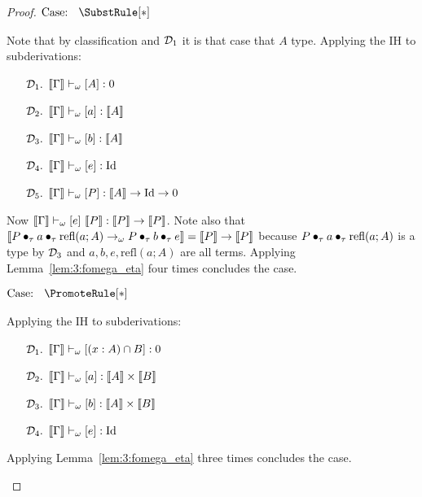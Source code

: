 \begin{proof}
    \begin{minipage}{.8\textwidth}$\text{Case: }\begin{array}{c} \SubstRule[*] \end{array}$\end{minipage}
    \begin{proofcase}
        Note that by classification and $\mathcal{D}_{1}$ it is that case that $A$ type.
        Applying the IH to subderivations:
        \begin{enumerate}
            \item[$\mathcal{D}_{1}.$] $\llbracket \Gamma \rrbracket \vdash_\omega [A] : 0$
            \item[$\mathcal{D}_{2}.$] $\llbracket \Gamma \rrbracket \vdash_\omega [a] : \llbracket A \rrbracket$
            \item[$\mathcal{D}_{3}.$] $\llbracket \Gamma \rrbracket \vdash_\omega [b] : \llbracket A \rrbracket$ 
            \item[$\mathcal{D}_{4}.$] $\llbracket \Gamma \rrbracket \vdash_\omega [e] : \textnormal{Id}$
            \item[$\mathcal{D}_{5}.$] $\llbracket \Gamma \rrbracket \vdash_\omega [P] : \llbracket A \rrbracket \to \textnormal{Id} \to 0$
        \end{enumerate}
        Now $\sema{\Gamma} \vdash_\omega [e]\ \sema{P} : \sema{P} \to \sema{P}$.
        Note also that $\llbracket P \bullet_{\tau} a \bullet_{\tau} \text{refl}(a;A) \to_\omega P \bullet_{\tau} b \bullet_{\tau} e \rrbracket = \llbracket P \rrbracket \to \llbracket P \rrbracket$ because $P \bullet_{\tau} a \bullet_{\tau} \text{refl}(a;A)$ is a type by $\mathcal{D}_{3}$ and $a, b, e, \text{refl}(a;A)$ are all terms.
        Applying Lemma~\ref{lem:3:fomega_eta} four times concludes the case.
    \end{proofcase}

    $\text{Case: }\begin{array}{c} \PromoteRule[*] \end{array}$
    \begin{proofcase}
        Applying the IH to subderivations:
        \begin{enumerate}
            \item[$\mathcal{D}_{1}.$] $\llbracket \Gamma \rrbracket \vdash_\omega [(x : A) \cap B] : 0$
            \item[$\mathcal{D}_{2}.$] $\llbracket \Gamma \rrbracket \vdash_\omega [a] : \llbracket A \rrbracket \times \llbracket B \rrbracket$
            \item[$\mathcal{D}_{3}.$] $\llbracket \Gamma \rrbracket \vdash_\omega [b] : \llbracket A \rrbracket \times \llbracket B \rrbracket$
            \item[$\mathcal{D}_{4}.$] $\llbracket \Gamma \rrbracket \vdash_\omega [e] : \textnormal{Id}$
        \end{enumerate}
        Applying Lemma~\ref{lem:3:fomega_eta} three times concludes the case.
    \end{proofcase}


\end{proof}
